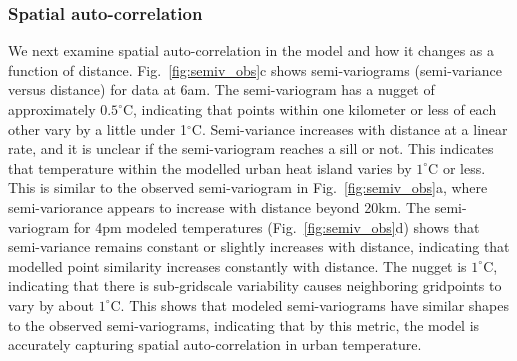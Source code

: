 \subsubsection{Spatial auto-correlation}
We next examine spatial auto-correlation in the model and how it changes as a function of distance. Fig.~\ref{fig:semiv_obs}c shows semi-variograms (semi-variance versus distance) for data at 6am. The semi-variogram has a nugget of approximately $0.5^\circ$C, indicating that points within one kilometer or less of each other vary by a little under 1$^\circ$C. Semi-variance increases with distance at a linear rate, and it is unclear if the semi-variogram reaches a sill or not. This indicates that temperature within the modelled urban heat island varies by $1^\circ$C or less. This is similar to the observed semi-variogram in Fig.~\ref{fig:semiv_obs}a, where semi-variorance appears to increase with distance beyond 20km. The semi-variogram for 4pm modeled temperatures (Fig.~\ref{fig:semiv_obs}d) shows that semi-variance remains constant or slightly increases with distance, indicating that modelled point similarity increases constantly with distance. The nugget is $1^\circ$C, indicating that there is sub-gridscale variability causes neighboring gridpoints to vary by about $1^\circ$C. 
This shows that modeled semi-variograms have similar shapes to the observed semi-variograms, indicating that by this metric, the model is accurately capturing spatial auto-correlation in urban temperature. %

